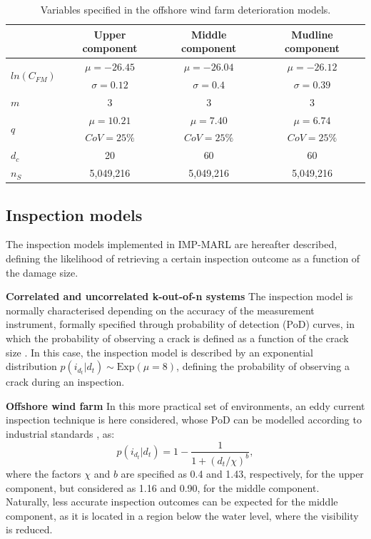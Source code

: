 \begin{table}
\centering
\caption{Variables specified in the offshore wind farm deterioration models.}
\label{tab:owf_fatigue}
\begin{tabular}{lccc}
\toprule
 & Upper component & Middle component & Mudline component  \\
 \midrule
\multirow{2}{*}{$ln(C_{FM})$} & $\mu=-26.45$ & $\mu=-26.04$ & $\mu=-26.12$ \\
& $\sigma=0.12$ & $\sigma=0.4$ &  $\sigma=0.39$ \\
$m$ & 3 & 3 & 3 \\
\multirow{2}{*}{$q$}   & $\mu=10.21$  & $\mu=7.40$ & $\mu=6.74$  \\
 & $CoV=25\% $  & $CoV=25\% $ & $CoV=25\% $  \\
$d_c$ & 20 & 60 & 60 \\
$n_{S}$ & 5,049,216 & 5,049,216 & 5,049,216
\\
\bottomrule
\end{tabular}
\end{table}

\subsection{Inspection models}
The inspection models implemented in IMP-MARL are hereafter described, defining the likelihood of retrieving a certain inspection outcome as a function of the damage size.

\textbf{Correlated and uncorrelated k-out-of-n systems}
The inspection model is normally characterised depending on the accuracy of the measurement instrument, formally specified through probability of detection (PoD) curves, in which the probability of observing a crack is defined as a function of the crack size \citep{morato2022optimal}.
In this case, the inspection model is described by an exponential distribution $p({i_{d_t}}|d_t) \sim \text{Exp}(\mu = 8)$, defining the probability of observing a crack during an inspection.

\textbf{Offshore wind farm}
In this more practical set of environments, an eddy current inspection technique is here considered, whose PoD can be modelled according to industrial standards \citep{dnv2015probabilistic}, as:
\begin{equation} \label{eq:ex_pod1}
    p({i_{d_t}}|d_t) = 1 - \frac{1}{1+(d_t/\chi)^b}, 
\end{equation}
where the factors $\chi$ and $b$ are specified as 0.4 and 1.43, respectively, for the upper component, but considered as 1.16 and 0.90, for the middle component.
Naturally, less accurate inspection outcomes can be expected for the middle component, as it is located in a region below the water level, where the visibility is reduced.

